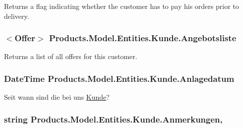 Returns a flag indicating whether the customer has to pay his orders prior to delivery. 

\subsubsection[{\texorpdfstring{Angebotsliste}{Angebotsliste}}]{$<${\bf Offer}$>$ Products.\+Model.\+Entities.\+Kunde.\+Angebotsliste\hspace{0.3cm}{\ttfamily [get]}}\hypertarget{class_products_1_1_model_1_1_entities_1_1_kunde_a73f1b78662a30f7739a679a4794834d3}{}\label{class_products_1_1_model_1_1_entities_1_1_kunde_a73f1b78662a30f7739a679a4794834d3}


Returns a list of all offers for this customer. 

\subsubsection[{\texorpdfstring{Anlagedatum}{Anlagedatum}}]{\setlength{\rightskip}{0pt plus 5cm}Date\+Time Products.\+Model.\+Entities.\+Kunde.\+Anlagedatum\hspace{0.3cm}{\ttfamily [get]}}\hypertarget{class_products_1_1_model_1_1_entities_1_1_kunde_a3fafe273d86608b8bd8f2ca874e6ceca}{}\label{class_products_1_1_model_1_1_entities_1_1_kunde_a3fafe273d86608b8bd8f2ca874e6ceca}


Seit wann sind die bei uns \hyperlink{class_products_1_1_model_1_1_entities_1_1_kunde}{Kunde}? 

\subsubsection[{\texorpdfstring{Anmerkungen}{Anmerkungen}}]{\setlength{\rightskip}{0pt plus 5cm}string Products.\+Model.\+Entities.\+Kunde.\+Anmerkungen\hspace{0.3cm}{\ttfamily [get]}, {\ttfamily [set]}}\hypertarget{class_products_1_1_model_1_1_entities_1_1_kunde_a0e52f0bcc71bb4702837a121b1078c47}{}\label{class_products_1_1_model_1_1_entities_1_1_kunde_a0e52f0bcc71bb4702837a121b1078c47}


